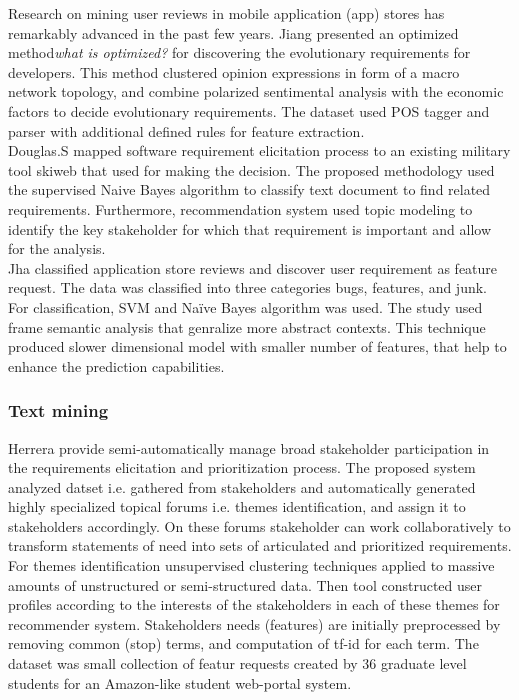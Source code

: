 Research on mining user reviews in mobile application (app) stores has
remarkably advanced in the past few years. Jiang \etal
\cite{Jiang:2014} presented an optimized method\emph{what is optimized?} for
discovering the evolutionary requirements for developers. This method clustered opinion expressions in form of a macro network
topology, and combine polarized sentimental analysis with the economic factors
to decide evolutionary requirements. The dataset used POS tagger and parser with
additional defined rules for feature extraction.\\

Douglas.S \etal\cite{Douglas:S2008} mapped software requirement elicitation process to an
existing military tool skiweb that used for making the decision. The proposed
methodology used the supervised Naive Bayes algorithm to classify text document
to find related requirements. Furthermore, recommendation system used topic modeling to
identify the key stakeholder for which that requirement is important and allow
for the analysis.\\

Jha \etal \cite{Jha:2017} classified application store reviews and discover user
requirement as feature request. The data was classified into three categories bugs,
features, and junk. For classification, SVM and Naïve Bayes algorithm was used.
The study used frame semantic analysis that genralize more abstract contexts.
This technique produced slower dimensional model with smaller number of
features, that help to enhance the prediction capabilities.\\


\subsubsection{Text mining}

 
 	Herrera \etal \cite{Castro-Herrera:2009} provide semi-automatically manage broad stakeholder participation in the requirements elicitation and prioritization process. 
The proposed system analyzed datset i.e. gathered from stakeholders and automatically generated highly specialized topical forums i.e. themes identification, and assign it to stakeholders accordingly.
On these forums stakeholder can work collaboratively to transform statements of need into sets of articulated and prioritized requirements. For themes identification unsupervised clustering
techniques applied to massive amounts of unstructured or semi-structured data. Then tool constructed user profiles according to the interests
of the stakeholders in each of these themes for recommender system. Stakeholders
needs (features) are initially preprocessed by removing common (stop) terms, and
computation of tf-id for each term. The dataset was  small collection of featur requests created by 36 graduate level students for an Amazon-like student web-portal system.\\


